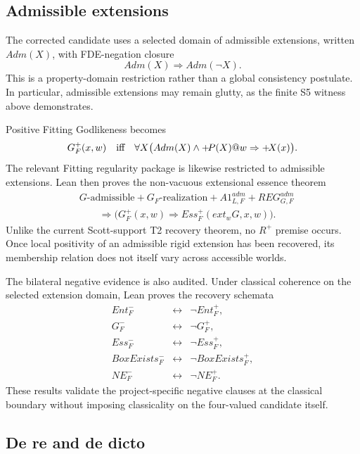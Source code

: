 \subsection{Admissible extensions}
\label{sec:fitting-admissible}

The corrected candidate uses a selected domain of admissible extensions, written \(Adm(X)\), with FDE-negation closure
\[
  Adm(X)\Longrightarrow Adm(\neg X).
\]
This is a property-domain restriction rather than a global consistency postulate. In particular, admissible extensions may remain glutty, as the finite S5 witness above demonstrates.

Positive Fitting Godlikeness becomes
\[
  G_F^+(x,w)
  \quad\text{iff}\quad
  \forall X\bigl(Adm(X)\land +\!P(X)@w
  \Rightarrow +\!X(x)\bigr).
\]
The relevant Fitting regularity package is likewise restricted to admissible extensions. Lean then proves the non-vacuous extensional essence theorem
\[
\begin{split}
  &G\text{-admissible}
  +G_F\text{-realization}
  +A1_{L,F}^{adm}
  +REG_{G,F}^{adm}\\
  &\qquad\Longrightarrow
  \bigl(G_F^+(x,w)\Rightarrow
  Ess_F^+(ext_wG,x,w)\bigr).
\end{split}
\]
Unlike the current Scott-support T2 recovery theorem, no \(R^+\) premise occurs. Once local positivity of an admissible rigid extension has been recovered, its membership relation does not itself vary across accessible worlds.

The bilateral negative evidence is also audited. Under classical coherence on the selected extension domain, Lean proves the recovery schemata
\[
\begin{array}{rcl}
 Ent_F^-&\leftrightarrow&\neg Ent_F^+,\\
 G_F^-&\leftrightarrow&\neg G_F^+,\\
 Ess_F^-&\leftrightarrow&\neg Ess_F^+,\\
 BoxExists_F^-&\leftrightarrow&\neg BoxExists_F^+,\\
 NE_F^-&\leftrightarrow&\neg NE_F^+.
\end{array}
\]
These results validate the project-specific negative clauses at the classical boundary without imposing classicality on the four-valued candidate itself.

\subsection{De re and de dicto}
\label{sec:fitting-dere}


